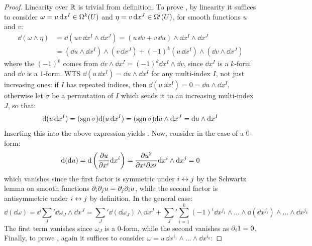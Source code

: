 \begin{proofbox}
  \begin{proof}
    Linearity over $ \mathbb{R} $ is trivial from definition. To prove , by linearity it suffices to consider $ \omega = u \, \mathrm{d} x^I \in \Omega^{k}(U) $ and $ \eta = v \, \mathrm{d} x^J \in \Omega^{l}(U) $, for smooth functions $ u $ and $ v $:
    \begin{equation*}
      \begin{split}
        \dd (\omega \wedge \eta)
        & = \dd (u v \, \dd x^I \wedge \dd x^J) = (u \, \dd v + v \, \dd u) \wedge \dd x^I \wedge \dd x^J \\
        & = (\dd u \wedge \dd x^I) \wedge (v \, \dd x^J) + (-1)^k (u \, \dd x^I) \wedge (\dd v \wedge \dd x^J)
      \end{split}
    \end{equation*}
    where the $ (-1)^k $ comes from $ \dd v \wedge \dd x^I = (-1)^k \dd x^I \wedge \dd v $, since $ \dd x^I $ is a $ k $-form and $ \dd v $ is a $ 1 $-form.
    WTS $ \dd (u \, \dd x^I) = \dd u \wedge \dd x^I $ for any multi-index $ I $, not just increasing ones: if $ I $ has repeated indices, then $ \dd (u \, \dd x^I) = 0 = \dd u \wedge \dd x^I $, otherwise let $ \sigma $ be a permutation of $ I $ which sends it to an increasing multi-index $ J $, so that:
    \begin{equation*}
      \mathrm{d} (u \, \mathrm{d} x^I) = (\mathrm{sgn}\,\sigma) \mathrm{d} (u \, \mathrm{d} x^I) = (\mathrm{sgn}\,\sigma) \mathrm{d} u \wedge \mathrm{d} x^J = \mathrm{d} u \wedge \mathrm{d} x^I
    \end{equation*}
    Inserting this into the above expression yields . Now, consider  in the case of a $ 0 $-form:
    \begin{equation*}
      \mathrm{d} (\mathrm{d} u) = \mathrm{d} \left( \frac{\partial u}{\partial x^i} \mathrm{d} x^i \right) = \frac{\partial u^2}{\partial x^i \partial x^j} \mathrm{d} x^i \wedge \mathrm{d} x^j = 0
    \end{equation*}
    which vanishes since the first factor is symmetric under $ i \leftrightarrow j $ by the Schwartz lemma on smooth functions $ \partial_i \partial_j u = \partial_j \partial_i u $, while the second factor is antisymmetric under $ i \leftrightarrow j $ by definition. In the general case:
    \begin{equation*}
      \dd (\dd \omega) = \dd {\sum_J}' \dd \omega_J \wedge \dd x^J = {\sum_J}' \dd (\dd \omega_J) \wedge \dd x^J + {\sum_J}' \sum_{i = 1}^k (-1)^i \dd x^{j_1} \wedge \dots \wedge \dd (\dd x^{j_i}) \wedge \dots \wedge \dd x^{j_k}
    \end{equation*}
    The first term vanishes since $ \omega_J $ is a $ 0 $-form, while the second vanishes as $ \partial_i 1 = 0 $. Finally, to prove , again it suffices to consider $ \omega = u \, \dd x^{i_1} \wedge \dots \wedge \dd x^{i_k} $:

\end{proof}
\end{proofbox}
